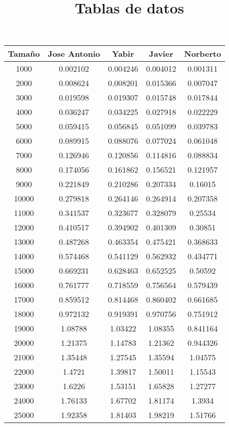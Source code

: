 \documentclass{article}
\title{Tablas de datos}
\begin{document}


\begin{tabular}{ | c | c  | c | c | c | }
  \hline
   Tama\~no & Jose Antonio & Yabir & Javier & Norberto\\ 
   \hline
1000	&	0.002102	&	0.004246	&	0.004012	&	0.001311	\\
2000	&	0.008624	&	0.008201	&	0.015366	&	0.007047	\\
3000	&	0.019598	&	0.019307	&	0.015748	&	0.017844	\\
4000	&	0.036247	&	0.034225	&	0.027918	&	0.022229	\\
5000	&	0.059415	&	0.056845	&	0.051099	&	0.039783	\\
6000	&	0.089915	&	0.088076	&	0.077024	&	0.061048	\\
7000	&	0.126946	&	0.120856	&	0.114816	&	0.088834	\\
8000	&	0.174056	&	0.161862	&	0.156521	&	0.121957	\\
9000	&	0.221849	&	0.210286	&	0.207334	&	0.16015	\\
10000	&	0.279818	&	0.264146	&	0.264914	&	0.207358	\\
11000	&	0.341537	&	0.323677	&	0.328079	&	0.25534	\\
12000	&	0.410517	&	0.394902	&	0.401309	&	0.30851	\\
13000	&	0.487268	&	0.463354	&	0.475421	&	0.368633	\\
14000	&	0.574468	&	0.541129	&	0.562932	&	0.434771	\\
15000	&	0.669231	&	0.628463	&	0.652525	&	0.50592	\\
16000	&	0.761777	&	0.718559	&	0.756564	&	0.579439	\\
17000	&	0.859512	&	0.814468	&	0.860402	&	0.661685	\\
18000	&	0.972132	&	0.919391	&	0.970756	&	0.751912	\\
19000	&	1.08788	&	1.03422	&	1.08355	&	0.841164	\\
20000	&	1.21375	&	1.14783	&	1.21362	&	0.944326	\\
21000	&	1.35448	&	1.27545	&	1.35594	&	1.04575	\\
22000	&	1.4721	&	1.39817	&	1.50011	&	1.15543	\\
23000	&	1.6226	&	1.53151	&	1.65828	&	1.27277	\\
24000	&	1.76133	&	1.67702	&	1.81174	&	1.3934	\\
25000	&	1.92358	&	1.81403	&	1.98219	&	1.51766	\\


  \hline
 \end{tabular}
 
\end{document}

